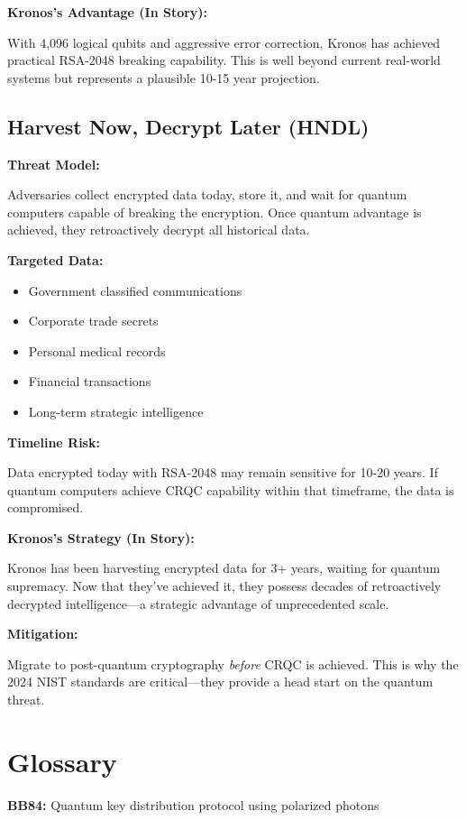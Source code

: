 \documentclass[12pt,oneside]{book}
\begin{document}
\textbf{Kronos's Advantage (In Story):}

With 4,096 logical qubits and aggressive error correction, Kronos has achieved practical RSA-2048 breaking capability. This is well beyond current real-world systems but represents a plausible 10-15 year projection.

\section{Harvest Now, Decrypt Later (HNDL)}

\textbf{Threat Model:}

Adversaries collect encrypted data today, store it, and wait for quantum computers capable of breaking the encryption. Once quantum advantage is achieved, they retroactively decrypt all historical data.

\textbf{Targeted Data:}
\begin{itemize}
\item Government classified communications
\item Corporate trade secrets
\item Personal medical records
\item Financial transactions
\item Long-term strategic intelligence
\end{itemize}

\textbf{Timeline Risk:}

Data encrypted today with RSA-2048 may remain sensitive for 10-20 years. If quantum computers achieve CRQC capability within that timeframe, the data is compromised.

\textbf{Kronos's Strategy (In Story):}

Kronos has been harvesting encrypted data for 3+ years, waiting for quantum supremacy. Now that they've achieved it, they possess decades of retroactively decrypted intelligence---a strategic advantage of unprecedented scale.

\textbf{Mitigation:}

Migrate to post-quantum cryptography \textit{before} CRQC is achieved. This is why the 2024 NIST standards are critical---they provide a head start on the quantum threat.

\chapter{Glossary}

\textbf{BB84:} Quantum key distribution protocol using polarized photons
\end{document}
